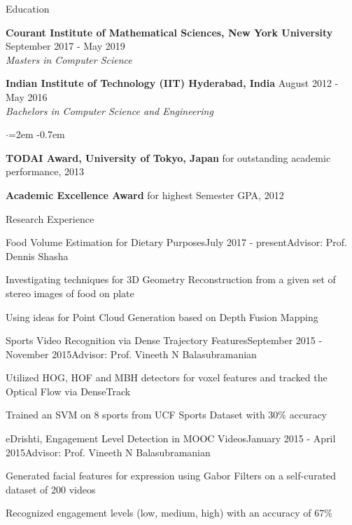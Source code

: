 \documentclass{resume}
\begin{document}
\begin{rSection}{Education}

{\bf Courant Institute of Mathematical Sciences, New York University} \hfill September 2017 - May 2019 \\
\it{Masters in Computer Science}

\vspace{-0.4em}

{\bf Indian Institute of Technology (IIT) Hyderabad, India} \hfill August 2012 - May 2016 \\
\it{Bachelors in Computer Science and Engineering}
\begin{list}{$\cdot$}{\leftmargin=2em}
\itemsep -0.7em \vspace{-0.5em}
\item {\bf TODAI Award, University of Tokyo, Japan} for outstanding academic performance, 2013
\item {\bf Academic Excellence Award} for highest Semester GPA, 2012
\end{list}

\end{rSection}

\begin{rSection}{Research Experience}

\begin{rSubsection}{Food Volume Estimation for Dietary Purposes}{July 2017 - present}{Advisor: Prof. Dennis Shasha}{}
\item Investigating techniques for 3D Geometry Reconstruction from a given set of stereo images of food on plate
\item Using ideas for Point Cloud Generation based on Depth Fusion Mapping

\end{rSubsection}

\begin{rSubsection}{Sports Video Recognition via Dense Trajectory Features}{September 2015 - November 2015}{Advisor:  Prof. Vineeth N Balasubramanian}{}
\item Utilized HOG, HOF and MBH detectors for voxel features and tracked the Optical Flow via DenseTrack
\item Trained an SVM on 8 sports from UCF Sports Dataset with 30\% accuracy

\end{rSubsection}

\begin{rSubsection}{eDrishti, Engagement Level Detection in MOOC Videos}{January 2015 - April 2015}{Advisor:  Prof. Vineeth N Balasubramanian}{}
\item Generated facial features for expression using Gabor Filters on a self-curated dataset of 200 videos
\item Recognized engagement levels (low, medium, high) with an accuracy of 67\%

\end{rSubsection}

\end{rSection}
\end{document}
